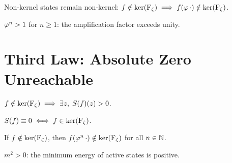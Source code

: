 \begin{theorem}[Irreversible]
\label{thm:second-law-irreversible}
Non-kernel states remain non-kernel:
$f\notin\ker(\operatorname{F_\zeta}) \implies f(\varphi\,\cdot)\notin\ker(\operatorname{F_\zeta})$.
\end{theorem}

\begin{theorem}[Amplification]
\label{thm:amplification}
$\varphi^n > 1$ for $n \ge 1$: the amplification factor exceeds unity.
\end{theorem}

\section{Third Law: Absolute Zero Unreachable}

\begin{theorem}
\label{thm:positive-entropy}
$f \notin \ker(\operatorname{F_\zeta}) \implies \exists z,\; S(f)(z) > 0$.
\end{theorem}

\begin{theorem}
\label{thm:absolute-zero}
$S(f) \equiv 0 \iff f \in \ker(\operatorname{F_\zeta})$.
\end{theorem}

\begin{theorem}
\label{thm:finite-unreachable}
If $f\notin\ker(\operatorname{F_\zeta})$, then $f(\varphi^n\,\cdot)\notin\ker(\operatorname{F_\zeta})$
for all $n\in\mathbb{N}$.
\end{theorem}

\begin{theorem}
\label{thm:third-law-mass-gap}
$m^2 > 0$: the minimum energy of active states is positive.
\end{theorem}
